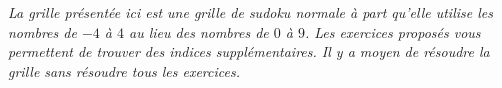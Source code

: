 \documentclass[a4paper,12pt]{book}
\begin{document}
\newpage

\begin{center}
    \emph{La grille présentée ici est une grille de sudoku normale à part qu'elle utilise les nombres de \( -4\) à \( 4\) au lieu des nombres de \( 0\) à \( 9\). Les exercices proposés vous permettent de trouver des indices supplémentaires. Il y a moyen de résoudre la grille sans résoudre tous les exercices.}
\end{center}


\clearpage


\end{document}
